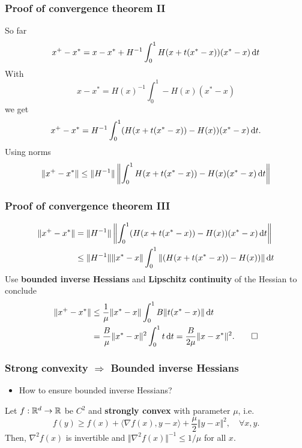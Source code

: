 \documentclass[aspectratio=149]{beamer}
\begin{document}
\begin{frame}
  \frametitle{Proof of convergence theorem II}
  So far
  \begin{equation}
      x^+ - x^* = x - x^* + H^{-1} \int_{0}^{1} H(x + t(x^* - x))(x^* - x) \mathop{}\!\mathrm{d} t
  \end{equation}
  With
  \begin{equation}
    x- x^* = {H(x)}^{-1} \int_{0}^{1} - H(x)(x^*-x)
  \end{equation}
  we get
  \begin{equation}
    x^+ - x^* =  H^{-1} \int_{0}^{1} (H(x + t(x^* - x))- H(x))(x^* - x) \mathop{}\!\mathrm{d} t.
  \end{equation}
  Using norms
  \begin{equation}
    \Vert x^+ - x^*  \Vert \le  \Vert H^{-1} \Vert \left\Vert  \int_{0}^{1} H(x + t(x^* - x))- H(x)(x^* - x) \mathop{}\!\mathrm{d} t \right\Vert
  \end{equation}
\end{frame}


\begin{frame}
  \frametitle{Proof of convergence theorem III}

  \begin{align}
    \Vert x^+ - x^*  \Vert &=  \Vert H^{-1} \Vert \left\Vert  \int_{0}^{1} (H(x + t(x^* - x))- H(x))(x^* - x) \mathop{}\!\mathrm{d} t \right\Vert \\
    &\le \Vert H^{-1} \Vert  \Vert x^* - x \Vert \int_{0}^{1} \left\Vert  (H(x + t(x^* - x))- H(x)) \right\Vert \mathop{}\!\mathrm{d} t
  \end{align}
  Use \textbf{bounded inverse Hessians} and \textbf{Lipschitz continuity} of the Hessian to conclude
  \begin{align}
    \Vert x^+ - x^*  \Vert  &\le \frac{1}{\mu} \Vert x^* - x \Vert \int_{0}^{1} B \Vert t(x^*-x) \Vert \mathop{}\!\mathrm{d} t  \\
    &= \frac{B}{\mu} \Vert x^*-x \Vert^2 \int_{0}^{1}t \mathop{}\!\mathrm{d} t = \frac{B}{2\mu} \Vert x-x^* \Vert^2. \qed
  \end{align}

\end{frame}


\begin{frame}
  \frametitle{Strong convexity $\Rightarrow$ Bounded inverse Hessians}

  \begin{itemize}
    \item How to ensure bounded inverse Hessians?
  \end{itemize}

  \begin{lemma}%
    Let $f: \mathbb{R}^d \to \mathbb{R}$ be $C^2$ and \textbf{strongly convex} with parameter $\mu$, i.e.\
    \begin{equation}
      f(y) \ge f(x) + \langle \nabla f(x), y-x \rangle + \frac{\mu}{2} \Vert y-x \Vert^2, \quad \forall x,y.
    \end{equation}
  Then, $\nabla^2 f(x)$ is invertible and $\Vert \nabla^2 f(x) \Vert^{-1} \le 1/\mu$ for all $x$.
  \end{lemma}

\end{frame}
\end{document}
